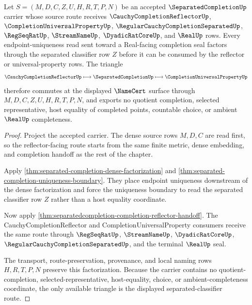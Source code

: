 \begin{theorem}
\label{thm:separatedcompletion-cauchy-reflector-triangle}
Let $S=(M,D,C,Z,U,H,R,T,P,N)$ be an accepted $\SeparatedCompletionUp$ carrier whose source route receives $\CauchyCompletionReflectorUp$, $\CompletionUniversalPropertyUp$, $\RegularCauchyCompletionSeparatedUp$, $\RegSeqRatUp$, $\StreamNameUp$, $\DyadicRatCoreUp$, and $\RealUp$ rows. Every endpoint-uniqueness read sent toward a Real-facing completion seal factors through the separated classifier row $Z$ before it can be consumed by the reflector or universal-property rows. The triangle
$$
\CauchyCompletionReflectorUp
\longmapsto
\SeparatedCompletionUp
\longmapsto
\CompletionUniversalPropertyUp
$$
therefore commutes at the displayed $\NameCert$ surface through $M,D,C,Z,U,H,R,T,P,N$, and exports no quotient completion, selected representative, host equality of completed points, countable choice, or ambient $\RealUp$ completeness.
\end{theorem}
\begin{proof}
Project the accepted carrier. The dense source rows $M,D,C$ are read first, so the reflector-facing route starts from the same finite metric, dense embedding, and completion handoff as the rest of the chapter.

Apply \autoref{thm:separated-completion-dense-factorization} and \autoref{thm:separated-completion-uniqueness-boundary}. They place endpoint uniqueness downstream of the dense factorization and force the uniqueness boundary to read the separated classifier row $Z$ rather than a host equality coordinate.

Now apply \autoref{thm:separatedcompletion-completion-reflector-handoff}. The CauchyCompletionReflector and CompletionUniversalProperty consumers receive the same route through $\RegSeqRatUp$, $\StreamNameUp$, $\DyadicRatCoreUp$, $\RegularCauchyCompletionSeparatedUp$, and the terminal $\RealUp$ seal.

The transport, route-preservation, provenance, and local naming rows $H,R,T,P,N$ preserve this factorization. Because the carrier contains no quotient-completion, selected-representative, host-equality, choice, or ambient-completeness coordinate, the only available triangle is the displayed separated-classifier route.
\end{proof}

